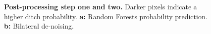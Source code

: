 \documentclass[11pt, review]{elsarticle} %
\begin{document}
\begin{figure} [!htb]
    \caption{\textbf{Post-processing step one and two.} Darker pixels indicate a higher ditch probability. \textbf{a: }Random Forests probability prediction. \textbf{b: }Bilateral de-noising.}
    \label{fig:postprocessing1}
\end{figure}

\begin{figure} [!htb]
    \centering
    \hspace{5pt}
    \subfigure[]{
}
\end{figure}
\end{document}
